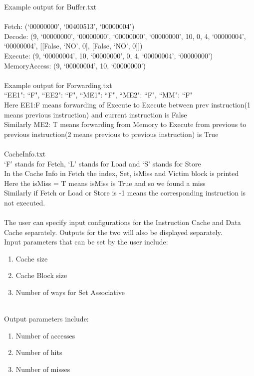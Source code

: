\documentclass{article}
\begin{document}
\newpage
Example output for Buffer.txt\\\\
Fetch: (`00000000', `00400513', `00000004') \\
Decode: (9, `00000000', `00000000', `00000000', `00000000', 10, 0, 4, `00000004', `00000004', [[False, `NO', 0], [False, `NO', 0]]) \\
Execute: (9, `00000004', 10, `00000000', 0, 4, `00000004', `00000000') \\
MemoryAccess: (9, `00000004', 10, `00000000') \\\\
Example output for Forwarding.txt\\
{``EE1": ``F", ``EE2": ``F", ``ME1": ``F", ``ME2": ``F", ``MM": ``F"}\\
Here EE1:F means forwarding of Execute to Execute between prev instruction(1 means previous instruction) and current instruction is False\\
Similarly ME2: T means forwarding from Memory to Execute from previous to previous instruction(2 means previous to previous instruction) is True\\\\
CacheInfo.txt\\
`F' stands for Fetch, `L' stands for Load and `S' stands for Store\\
In the Cache Info in Fetch the index, Set, isMiss and Victim block is printed\\
Here the isMiss = T means isMiss is True and so we found a miss\\
Similarly if Fetch or Load or Store is -1 means the corresponding instruction is not executed.\\
\\The user can specify input configurations for the Instruction Cache and Data Cache separately. Outputs for the two will also be displayed separately.\\
Input parameters that can be set by the user include:
\begin{enumerate}
    \item Cache size
    \item Cache Block size
    \item Number of ways for Set Associative
\end{enumerate}
\\Output parameters include:
\begin{enumerate}
    \item Number of accesses
    \item Number of hits
    \item Number of misses
\end{enumerate}
\end{document}
